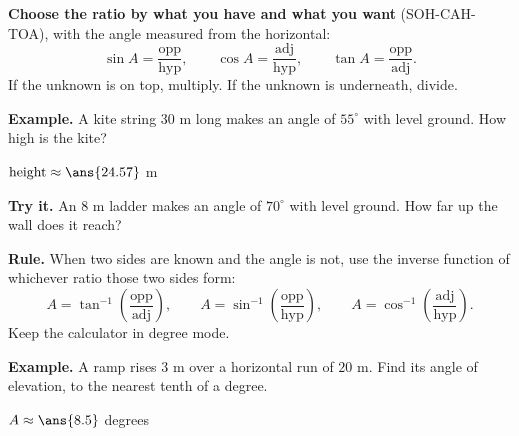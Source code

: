 \documentclass[12pt]{article}
\begin{document}


\begin{formulabox}
\textbf{Choose the ratio by what you have and what you want} (SOH-CAH-TOA), with
the angle measured from the horizontal:
\[ \sin A = \frac{\text{opp}}{\text{hyp}}, \qquad
   \cos A = \frac{\text{adj}}{\text{hyp}}, \qquad
   \tan A = \frac{\text{opp}}{\text{adj}}. \]
If the unknown is on top, multiply. If the unknown is underneath, divide.
\end{formulabox}

\begin{examplebox}
\textbf{Example.} A kite string $30$ m long makes an angle of $55^\circ$ with
level ground. How high is the kite?

$\text{height} \approx \ans{24.57}$ m
\end{examplebox}

\begin{tryitbox}
\textbf{Try it.} An $8$ m ladder makes an angle of $70^\circ$ with level ground.
How far up the wall does it reach?\\[2pt]
\end{tryitbox}


\begin{formulabox}
\textbf{Rule.} When two sides are known and the angle is not, use the inverse
function of whichever ratio those two sides form:
\[ A = \tan^{-1}\!\left(\frac{\text{opp}}{\text{adj}}\right), \qquad
   A = \sin^{-1}\!\left(\frac{\text{opp}}{\text{hyp}}\right), \qquad
   A = \cos^{-1}\!\left(\frac{\text{adj}}{\text{hyp}}\right). \]
Keep the calculator in degree mode.
\end{formulabox}

\begin{examplebox}
\textbf{Example.} A ramp rises $3$ m over a horizontal run of $20$ m. Find its
angle of elevation, to the nearest tenth of a degree.

$A \approx \ans{8.5}$ degrees
\end{examplebox}
\end{document}
